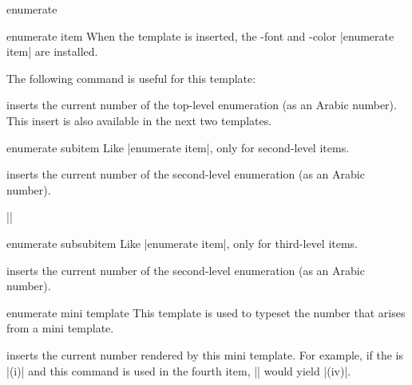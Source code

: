 \begin{environment}{{enumerate}}
\begin{template}{enumerate item}
    When the template is inserted, the \beamer-font and -color
    |enumerate item| are installed.

    The following command is useful for this template:
    \begin{templateinserts}
      \iteminsert{\insertenumlabel}
      inserts the current number of the top-level enumeration (as an
      Arabic number). This insert is also available in the next two
      templates. 
    \end{templateinserts}
  \end{template}

  \begin{template}{enumerate subitem}
    Like |enumerate item|, only for second-level items. 

    \begin{templateinserts}
      \iteminsert{\insertsubenumlabel}
      inserts the current number of the second-level enumeration (as an
      Arabic number). 
    \end{templateinserts}

    \example ||
  \end{template}

  \begin{template}{enumerate subsubitem}
    Like |enumerate item|, only for third-level items. 

    \begin{templateinserts}
      \iteminsert{\insertsubsubenumlabel}
      inserts the current number of the second-level enumeration (as an
      Arabic number). 
    \end{templateinserts}
  \end{template}

  \begin{template}{enumerate mini template}
    This template is used to typeset the number that arises from a
    mini template.

    \begin{templateinserts}
      \iteminsert{\insertenumlabel}
      inserts the current number rendered by this mini template. For
      example, if the  is |(i)| and this command
      is used in the fourth item, |\insertenumlabel| would yield
      |(iv)|.
    \end{templateinserts}
  \end{template}
\end{environment}

